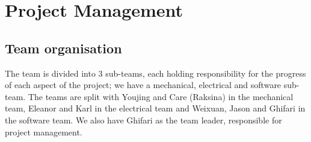










\maketitle


\section{Project Management}

\subsection{Team organisation}

The team is divided into 3 sub-teams, each holding responsibility for the progress of each aspect of the project; we have a mechanical, electrical and software sub-team. The teams are split with Youjing and Care (Raksina) in the mechanical team, Eleanor and Karl in the electrical team and Weixuan, Jason and Ghifari in the software team. We also have Ghifari as the team leader, responsible for project management.


